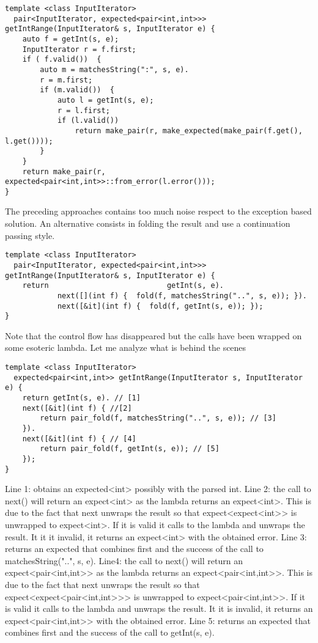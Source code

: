 \documentclass[a4paper,10pt]{article}
\begin{document}
\begin{lstlisting}
template <class InputIterator>
  pair<InputIterator, expected<pair<int,int>>> getIntRange(InputIterator& s, InputIterator e) {
    auto f = getInt(s, e);
    InputIterator r = f.first;
    if ( f.valid())  {
        auto m = matchesString(":", s, e).
        r = m.first;
        if (m.valid())  {
            auto l = getInt(s, e);
            r = l.first;
            if (l.valid())  
                return make_pair(r, make_expected(make_pair(f.get(), l.get())));
        }
    }        
    return make_pair(r, expected<pair<int,int>>::from_error(l.error()));
}
\end{lstlisting}

The preceding approaches contains too much noise respect to the exception based solution. An alternative consists in folding the result and use a continuation passing style. 

\begin{lstlisting}
template <class InputIterator>
  pair<InputIterator, expected<pair<int,int>>> getIntRange(InputIterator& s, InputIterator e) {
    return                           getInt(s, e). 
    		next([](int f) {  fold(f, matchesString("..", s, e)); }). 
    		next([&it](int f) {  fold(f, getInt(s, e)); });
}
\end{lstlisting}

Note that the control flow has disappeared but the calls have been wrapped on some esoteric lambda. Let me analyze what is behind the scenes

\begin{lstlisting}
template <class InputIterator>
  expected<pair<int,int>> getIntRange(InputIterator s, InputIterator e) {
    return getInt(s, e). // [1]
    next([&it](int f) { //[2]
        return pair_fold(f, matchesString("..", s, e)); // [3]
    }). 
    next([&it](int f) { // [4]
        return pair_fold(f, getInt(s, e)); // [5]
    });
}
\end{lstlisting}

Line 1: obtains an expected<int> possibly with the parsed int. 
Line 2: the call to next() will return an expect<int> as the lambda returns an expect<int>. This is due to the fact that next unwraps the result so that expect<expect<int>> is unwrapped to expect<int>. 
If it is valid it calls to the lambda and unwraps the result. It it it invalid, it returns an expect<int> with the obtained error.
Line 3: returns an expected that combines first and the success of the call to  matchesString("..", s, e).
Line4:  the call to next() will return an expect<pair<int,int>> as the lambda returns an expect<pair<int,int>>. This is due to the fact that next unwraps the result so that expect<expect<pair<int,int>>> is unwrapped to expect<pair<int,int>>. 
If it is valid it calls to the lambda and unwraps the result. It it is invalid, it returns an expect<pair<int,int>> with the obtained error.
Line 5: returns an expected that combines first and the success of the call to  getInt(s, e).
\end{document}
